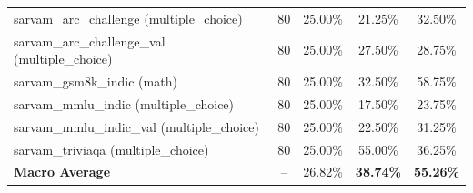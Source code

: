 \begin{table}[ht]
\begin{tabular}{lcccc}
sarvam\_arc\_challenge (multiple\_choice) & 80 & 25.00\% & 21.25\% & 32.50\% \\
sarvam\_arc\_challenge\_val (multiple\_choice) & 80 & 25.00\% & 27.50\% & 28.75\% \\
sarvam\_gsm8k\_indic (math) & 80 & 25.00\% & 32.50\% & 58.75\% \\
sarvam\_mmlu\_indic (multiple\_choice) & 80 & 25.00\% & 17.50\% & 23.75\% \\
sarvam\_mmlu\_indic\_val (multiple\_choice) & 80 & 25.00\% & 22.50\% & 31.25\% \\
sarvam\_triviaqa (multiple\_choice) & 80 & 25.00\% & 55.00\% & 36.25\% \\
\hline
\textbf{Macro Average} & -- & 26.82\% & \textbf{38.74\%} & \textbf{55.26\%} \\
\hline
\end{tabular}
\end{table}
